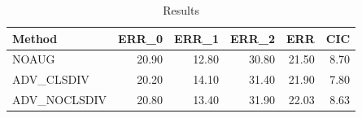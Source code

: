 \begin{table}
\caption{Results}
\label{tab:Results}
\begin{tabular}{lrrrrr}
\toprule
Method & ERR\_0 & ERR\_1 & ERR\_2 & ERR & CIC \\
\midrule
NOAUG & 20.90 & 12.80 & 30.80 & 21.50 & 8.70 \\
ADV\_CLSDIV & 20.20 & 14.10 & 31.40 & 21.90 & 7.80 \\
ADV\_NOCLSDIV & 20.80 & 13.40 & 31.90 & 22.03 & 8.63 \\
\bottomrule
\end{tabular}
\end{table}
